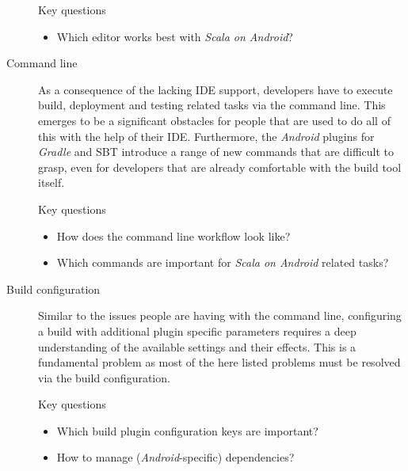 \begin{description}
\begin{highlight}{Key questions}
\begin{itemize}
			\item Which editor works best with \textit{Scala on Android}?

		\end{itemize}

	\end{highlight}

	\item[Command line]\hfill

	As a consequence of the lacking \ac{IDE} support, developers have to execute build, deployment and testing related tasks via the command line. This emerges to be a significant obstacles for people that are used to do all of this with the help of their \ac{IDE}. Furthermore, the \textit{Android} plugins for \textit{Gradle} and \ac{SBT} introduce a range of new commands that are difficult to grasp, even for developers that are already comfortable with the build tool itself.

	\begin{highlight}{Key questions}

		\begin{itemize}

			\item How does the command line workflow look like?

			\item Which commands are important for \textit{Scala on Android} related tasks?

		\end{itemize}

	\end{highlight}

	\item[Build configuration]\hfill

	Similar to the issues people are having with the command line, configuring a build with additional plugin specific parameters requires a deep understanding of the available settings and their effects. This is a fundamental problem as most of the here listed problems must be resolved via the build configuration.

	\begin{highlight}{Key questions}

		\begin{itemize}

			\item Which build plugin configuration keys are important?

			\item How to manage (\textit{Android}-specific) dependencies?


\end{itemize}
\end{highlight}
\end{description}
